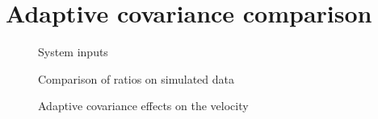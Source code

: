 \documentclass[class=article, crop=false]{standalone}
\begin{document}
\section{Adaptive covariance comparison}\label{sec:exp-covar}



\begin{figure}
    
    
    \caption{System inputs}
\end{figure}

\begin{figure}
    
    
    
    \caption{Comparison of ratios on simulated data}
\end{figure}

\begin{figure}
    
    
    
    \caption{Adaptive covariance effects on the velocity}
\end{figure}
\end{document}
